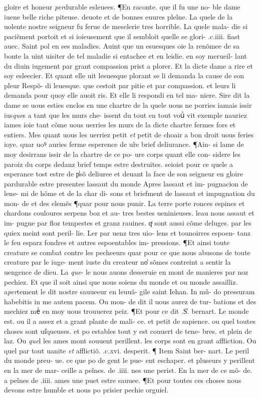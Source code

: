 \documentclass{article}
\begin{document}
\begin{pages}
gloire et honeur \textit{per}durable esleuees. ¶En raconte. que il fu une no- ble dame iuene belle riche piteuse. deuote et de bonnes euures pleĩne. La quele de la uolente nostre seigneur fu ferue de meselerie tres horrible. La quele mala- die si paciẽment portoit et si ioieusement que il sembloit quelle se glori- .c.iiii. fiast auec. Saint pol en ses maladies. Auint que un esuesques oie la renõmee de sa bonte la uint uisiter de tel maladie si entachee et en leidie. en soy merueil- lant du diuin iugement par grant compassion prist a plorer. Et la dicte dame a rire et soy esleecier. Et quant elle uit lesuesque plorant se li demanda la cause de son pleur Respõ- di leuesque. que cestoit par pitie et par compassion. et leurs li demanda pour quoy elle auoit ris. Et elle li respondi en tel ma- niere. Sire dit la dame se uous esties enclos en une chartre de la quele uous ne porries iamais issir ius\textit{que}s a tant que les murs che- issent du tout en tout vouᷤ vit exemple nauriez iames ioie tant cõme uous uerries les murs de la dicte chartre fermes fors et entiers. Mes quant uous les uerriez petit \textit{et} petit de choair a bon droit uous feries ioye. quar uoꝰ auries ferme esperence de ur̃e brief deliurance. ¶Ain- si lame de moy desirrans issir de la chartre de ce po- ure corps quant elle con- sidere les paroiz du corps dedanz brief temps estre destruites. seioist pour ce quele a esperance tost estre de p̾sõ deliuree et deuant la face de son seigneur en gloire pardurable estre presentee lassaut du monde Apres lassaut et im- pugnacion de lene- mi de hõme et de la char di- sons et briefment de lassaut et impugnation du mon- de et des elemẽs ¶quar pour nous punir. La terre porte ronces espines et chardons couloures serpens boz et au- tres bestes ueninieuses. leau nous assaut et im- pugne par floz tempestes et granz rauines. qͥ sont aussi cõme deluges. par les quiex meint sont peril- lie. Ler par uenz tres uio- lens et tounoirres espoen- tanz le feu esparz fondres et autres espoentables im- pressions. ¶Et ainsi toute creature se combat contre les pecheeurs quar pour ce que nous abusons de toute creature par le iuge- ment iuste du createur no̾ sõmes contreint a sentir la uengence de dieu. La \textit{que}- le nous auons desseruie en mont de manieres par noz pechiez. Et que il soit ainsi que nous soiens du monde et ou monde assailliz. a\textit{per}tement le dit nostre sauueeur en leuuã- gile saint Iehan. In mũ- do pressuram habebitis in me autem pacem. Ou mon- de dit il uous aurez de tur- bations et des mechiez meᷤ en moy uous trouuerez peiz. ¶Et pour ce dit .S̾. bernart. Le monde est. ou il a assez et a grant plante de mali- ce. et petit de sapience. ou quel toutes choses sont ui̾queuses. et po estables tout y est couuert de tene- bres. et plein de laz. Ou \textit{que}l les ames mont souuent perillent. les corps sont en grant affliction. Ou quel par tout uanite \textit{et} afflictiõ. .c.xvi. desperit. ¶ Item Saint ber- nart. Le peril du monde preu- ue. ce que po de gent le pue- ent eschaper. et pluseurs y perillent en la mer de mar- ceille a peĩnes. de .iiii. nes une perist. En la mer de ce mõ- de. a peĩnes de .iiii. ames une puet estre sauuee. ¶Et pour toutes ces choses nous devons estre humble et nous po prisier pechie orguiel. 
\end{pages}
\end{document}
